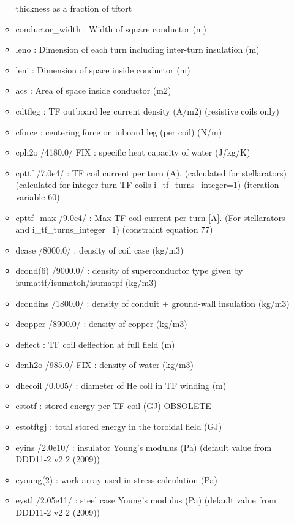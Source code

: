 \documentclass[
]{article}
\begin{document}
\begin{itemize}
\begin{itemize}
    thickness as a fraction of tftort
  \item
    conductor\_width : Width of square conductor (m)
  \item
    leno : Dimension of each turn including inter-turn insulation (m)
  \item
    leni : Dimension of space inside conductor (m)
  \item
    acs : Area of space inside conductor (m2)
  \item
    cdtfleg : TF outboard leg current density (A/m2) (resistive coils
    only)
  \item
    cforce : centering force on inboard leg (per coil) (N/m)
  \item
    cph2o /4180.0/ FIX : specific heat capacity of water (J/kg/K)
  \item
    cpttf /7.0e4/ : TF coil current per turn (A). (calculated for
    stellarators) (calculated for integer-turn TF coils
    i\_tf\_turns\_integer=1) (iteration variable 60)
  \item
    cpttf\_max /9.0e4/ : Max TF coil current per turn {[}A{]}. (For
    stellarators and i\_tf\_turns\_integer=1) (constraint equation 77)
  \item
    dcase /8000.0/ : density of coil case (kg/m3)
  \item
    dcond(6) /9000.0/ : density of superconductor type given by
    isumattf/isumatoh/isumatpf (kg/m3)
  \item
    dcondins /1800.0/ : density of conduit + ground-wall insulation
    (kg/m3)
  \item
    dcopper /8900.0/ : density of copper (kg/m3)
  \item
    deflect : TF coil deflection at full field (m)
  \item
    denh2o /985.0/ FIX : density of water (kg/m3)
  \item
    dhecoil /0.005/ : diameter of He coil in TF winding (m)
  \item
    estotf : stored energy per TF coil (GJ) OBSOLETE
  \item
    estotftgj : total stored energy in the toroidal field (GJ)
  \item
    eyins /2.0e10/ : insulator Young's modulus (Pa) (default value from
    DDD11-2 v2 2 (2009))
  \item
    eyoung(2) : work array used in stress calculation (Pa)
  \item
    eystl /2.05e11/ : steel case Young's modulus (Pa) (default value
    from DDD11-2 v2 2 (2009))

\end{itemize}
\end{itemize}
\end{document}

